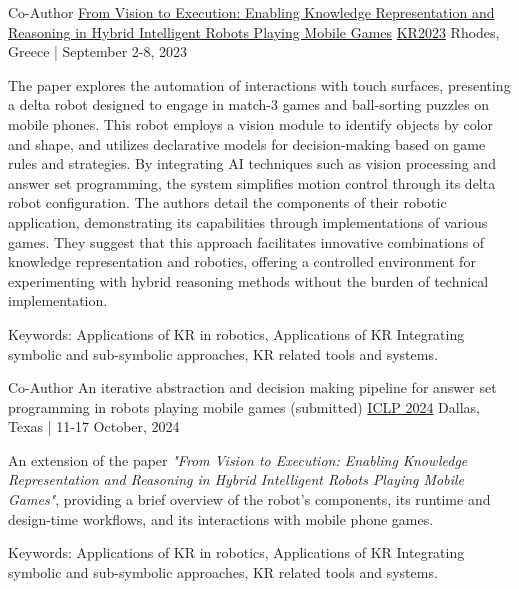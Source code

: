
\begin{cventries}

\cventry
    {Co-Author} %
    {\href{https://proceedings.kr.org/2023/5/}{From Vision to Execution: Enabling Knowledge Representation and Reasoning in Hybrid Intelligent Robots Playing Mobile Games}} %
    {\href{https://kr.org/KR2023/}{KR2023}} %
    {Rhodes, Greece | September 2-8, 2023} %
    {
      \begin{cvitems} %
        \item{The paper explores the automation of interactions with touch surfaces, presenting a delta robot designed to engage in match-3 games and ball-sorting puzzles on mobile phones. This robot employs a vision module to identify objects by color and shape, and utilizes declarative models for decision-making based on game rules and strategies. By integrating AI techniques such as vision processing and answer set programming, the system simplifies motion control through its delta robot configuration. The authors detail the components of their robotic application, demonstrating its capabilities through implementations of various games. They suggest that this approach facilitates innovative combinations of knowledge representation and robotics, offering a controlled environment for experimenting with hybrid reasoning methods without the burden of technical implementation.}
        \item Keywords: Applications of KR in robotics, Applications of KR Integrating symbolic and sub-symbolic approaches, KR related tools and systems.
      \end{cvitems}
    }

\cventry
    {Co-Author} %
    {An iterative abstraction and decision making pipeline for answer set programming in robots playing mobile games (submitted)} %
    {\href{https://www.iclp24.utdallas.edu/}{ICLP 2024}} %
    {Dallas, Texas | 11-17 October, 2024} %
    {
      \begin{cvitems} %
        \item An extension of the paper \textit{"From Vision to Execution: Enabling Knowledge Representation and Reasoning in Hybrid Intelligent Robots Playing Mobile Games"}, providing a brief overview of the robot’s components, its runtime and design-time workflows, and its interactions with mobile phone games.
        \item Keywords: Applications of KR in robotics, Applications of KR Integrating symbolic and sub-symbolic approaches, KR related tools and systems.
      \end{cvitems}
    }




\end{cventries}
